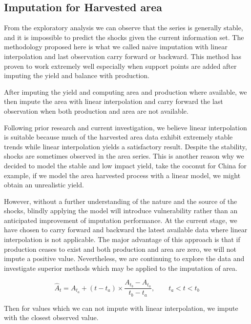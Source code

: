 \documentclass[nojss]{jss}\usepackage[]{graphicx}\usepackage[]{color}
\begin{document}
\subsection{Imputation for Harvested area}
From the exploratory analysis we can observe that the series is
generally stable, and it is impossible to predict the shocks given the
current information set. The methodology proposed here is what we
called naive imputation with linear interpolation and last observation
carry forward or backward. This method has proven to work extremely
well especially when support points are added after imputing the yield
and balance with production.


After imputing the yield and computing area and production where
available, we then impute the area with linear interpolation and carry
forward the last observation when both production and area are not
available.

Following prior research and current investigation, we believe linear
interpolation is suitable because much of the harvested area data
exhibit extremely stable trends while linear interpolation yields a
satisfactory result. Despite the stability, shocks are sometimes
observed in the area series.  This is another reason why we decided to
model the stable and low impact yield, take the coconut for China for
example, if we model the area harvested process with a linear model,
we might obtain an unrealistic yield.

However, without a further understanding of the nature and the source
of the shocks, blindly applying the model will introduce vulnerability
rather than an anticipated improvement of imputation performance. At
the current stage, we have chosen to carry forward and backward the
latest available data where linear interpolation is not
applicable. The major advantage of this approach is that if production
ceases to exist and both production and area are zero, we will not
impute a positive value. Nevertheless, we are continuing to explore
the data and investigate superior methods which may be applied to the
imputation of area.


\begin{equation}
  \label{eq:linearInterpolation}
  \hat{A}_t = A_{t_a} + (t - t_a) \times \frac{A_{t_b} - A_{t_a}}{t_b
    - t_a}, \quad\quad t_a < t < t_b
\end{equation}

Then for values which we can not impute with linear interpolation, we
impute with the closest observed value.
\end{document}
